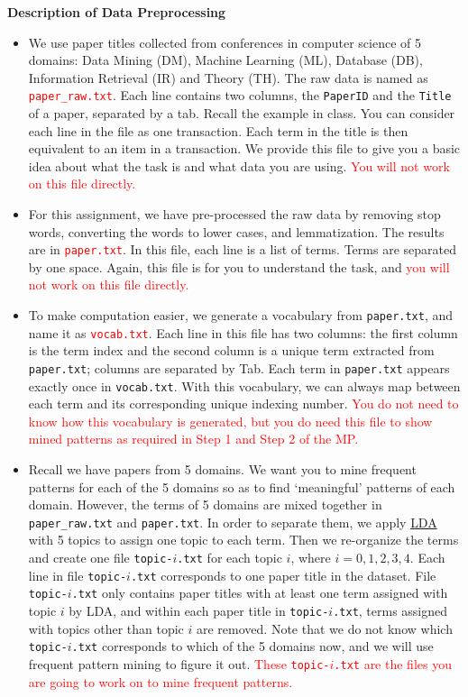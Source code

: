 \textbf{Description of Data Preprocessing}
\begin{itemize}
\item We use paper titles collected from conferences in computer science of 5 domains: Data Mining (DM), Machine Learning (ML), Database (DB), Information Retrieval (IR) and Theory (TH). The raw data is named as \textcolor{red}{\tt paper\_raw.txt}. Each line contains two columns, the {\tt PaperID} and the {\tt Title} of a paper, separated by a tab. Recall the example in class. You can consider each line in the file as one transaction. Each term in the title is then equivalent to an item in a transaction. We provide this file to give you a basic idea about what the task is and what data you are using. \textcolor{red}{You will not work on this file directly.}
\item For this assignment, we have pre-processed the raw data by removing stop words, converting the words to lower cases, and lemmatization. The results are in \textcolor{red}{\tt paper.txt}. In this file, each line is a list of terms. Terms are separated by one space. Again, this file is for you to understand the task, and \textcolor{red}{you will not work on this file directly.}
\item To make computation easier, we generate a vocabulary from {\tt paper.txt}, and name it as \textcolor{red}{\tt vocab.txt}. Each line in this file has two columns: the first column is the term index and the second column is a unique term extracted from {\tt paper.txt}; columns are separated by Tab. Each term in {\tt paper.txt} appears exactly once in {\tt vocab.txt}. With this vocabulary, we can always map between each term and its corresponding unique indexing number. \textcolor{red}{You do not need to know how this vocabulary is generated, but you do need this file to show mined patterns as required in Step 1 and Step 2 of the MP.}
\item Recall we have papers from 5 domains. We want you to mine frequent patterns for each of the 5 domains so as to find `meaningful' patterns of each domain. However, the terms of 5 domains are mixed together in {\tt paper\_raw.txt} and {\tt paper.txt}. In order to separate them, we apply \href{https://en.wikipedia.org/wiki/Latent_Dirichlet_allocation}{LDA} with 5 topics to assign one topic to each term. Then we re-organize the terms and create one file {\tt topic-$i$.txt} for each topic $i$, where $i=0,1,2,3,4$. Each line in file {\tt topic-$i$.txt} corresponds to one paper title in the dataset. File {\tt topic-$i$.txt} only contains paper titles with at least one term assigned with topic $i$ by LDA, and within each paper title in {\tt topic-$i$.txt}, terms assigned with topics other than topic $i$ are removed. Note that we do not know which {\tt topic-$i$.txt} corresponds to which of the 5 domains now, and we will use frequent pattern mining to figure it out. \textcolor{red}{These {\tt topic-$i$.txt} are the files you are going to work on to mine frequent patterns.}
\end{itemize}

